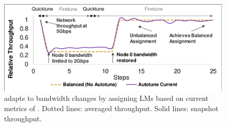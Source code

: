 


\begin{figure}
	\centering
	\includegraphics[width=.7\linewidth, trim=2 1 3 3,clip]{Figures/autotunebw.pdf}
	\caption{\autoplink adapts to bandwidth changes by assigning LMs based on current metrics of \ha. Dotted lines: averaged throughput. Solid lines: snapshot throughput.}
	\label{fig:autotunebw}
\end{figure}





